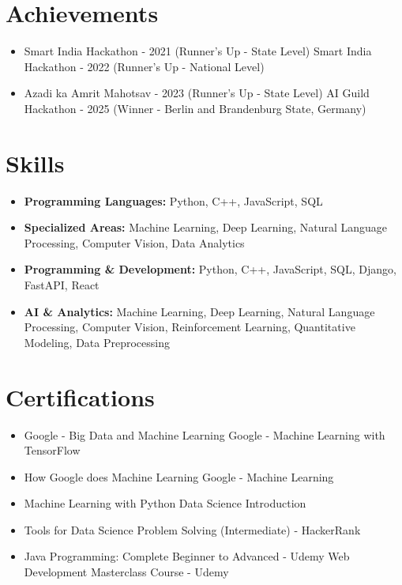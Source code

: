 \documentclass[a4paper,10pt]{article}
\begin{document}
\section*{Achievements}
\begin{itemize}
\item Smart India Hackathon - 2021 (Runner's Up - State Level) \hfill Smart India Hackathon - 2022 (Runner's Up - National Level)
\item Azadi ka Amrit Mahotsav - 2023 (Runner's Up - State Level) \hfill AI Guild Hackathon - 2025 (Winner - Berlin and Brandenburg State, Germany)
\end{itemize}

\section*{Skills}
\begin{itemize}
  \item \textbf{Programming Languages:} Python, C++, JavaScript, SQL
  \item \textbf{Specialized Areas:} Machine Learning, Deep Learning, Natural Language Processing, Computer Vision, Data Analytics
  \item \textbf{Programming \& Development:} Python, C++, JavaScript, SQL, Django, FastAPI, React
  \item \textbf{AI \& Analytics:} Machine Learning, Deep Learning, Natural Language Processing, Computer Vision, Reinforcement Learning, Quantitative Modeling, Data Preprocessing
\end{itemize}

\section*{Certifications}
\begin{itemize}
\item Google - Big Data and Machine Learning \hfill Google - Machine Learning with TensorFlow
\item How Google does Machine Learning \hfill Google - Machine Learning
\item Machine Learning with Python \hfill Data Science Introduction
\item Tools for Data Science \hfill Problem Solving (Intermediate) - HackerRank
\item Java Programming: Complete Beginner to Advanced - Udemy \hfill Web Development Masterclass Course - Udemy
\end{itemize}
\end{document}
